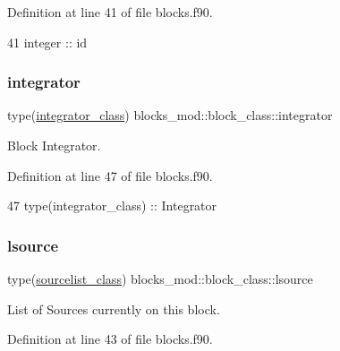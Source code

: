 Definition at line 41 of file blocks.\+f90.


\begin{DoxyCode}
41         \textcolor{keywordtype}{integer} :: id
\end{DoxyCode}
\mbox{\label{structblocks__mod_1_1block__class_ae98f0c5caf5f37db1c7f5bb8aace1c26}} 
\subsubsection{\texorpdfstring{integrator}{integrator}}
{\footnotesize\ttfamily type(\mbox{\hyperlink{structintegrator__mod_1_1integrator__class}{integrator\+\_\+class}}) blocks\+\_\+mod\+::block\+\_\+class\+::integrator\hspace{0.3cm}{\ttfamily [private]}}



Block Integrator. 



Definition at line 47 of file blocks.\+f90.


\begin{DoxyCode}
47         \textcolor{keywordtype}{type}(integrator\_class) :: Integrator
\end{DoxyCode}
\mbox{\label{structblocks__mod_1_1block__class_a2f4d63afb2696e2728f20a99e26a4b18}} 
\subsubsection{\texorpdfstring{lsource}{lsource}}
{\footnotesize\ttfamily type(\mbox{\hyperlink{structsources__list__mod_1_1sourcelist__class}{sourcelist\+\_\+class}}) blocks\+\_\+mod\+::block\+\_\+class\+::lsource\hspace{0.3cm}{\ttfamily [private]}}



List of Sources currently on this block. 



Definition at line 43 of file blocks.\+f90.


